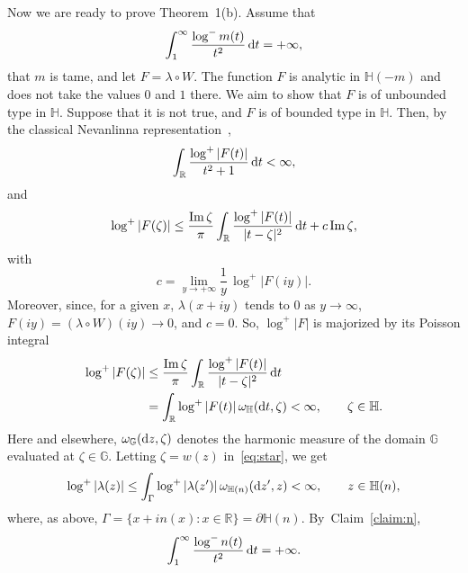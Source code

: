 \documentclass[12pt]{paper}
\newcommand{\bR}{\mathbb R}
\newcommand{\bH}{\mathbb H}
\newcommand{\bG}{\mathbb G}
\newcommand{\la}{\lambda}
\newcommand{\im}{{\rm Im}\,}
\begin{document}
Now we are ready to prove Theorem~1(b). Assume that 
\[ \int_1^\infty \frac{\log^- m(t)}{t^2}\, {\rm d}t = +\infty, \] 
that $m$ is tame, and let $F=\lambda \circ W$. The function $F$ is analytic in $\bH(-m)$ and does not take the values $0$ and $1$
there. We aim to show that $F$ is of unbounded type in $\bH$. Suppose that 
it is not true, and $F$ is of bounded type in $\bH$. Then, 
by the classical Nevanlinna representation~\cite[Chapter~VI, Theorem~3.1]{GO},
\begin{equation}\label{eq:logintegral}
\int_{\bR} \frac{\log^+|F(t)|}{t^2+1}\, {\rm d}t <\infty,
\end{equation}
and 
\[
\log^+|F(\zeta)| 
\le  \frac{\im \zeta}\pi \int_\bR \frac{\log^+ |F(t)|}{|t-\zeta|^2} \, {\rm d}t + c\, {\rm Im\,}\zeta,
\]
with
\[
c = \lim_{y\to +\infty} \frac1y\, \log^+ |F(iy)|.
\]
Moreover, since, for a given $x$, $\lambda (x+iy)$ tends to $0$ as $y\to\infty$,
$F(iy) = (\la\circ W)(iy)\to 0$, and $c=0$. So, 
$\log^+ |F|$ is majorized by its Poisson integral  
\begin{align}\label{eq:star}
\nonumber \log^+|F(\zeta)| 
&\le  \frac{\im \zeta}\pi \int_\bR \frac{\log^+ |F(t)|}{|t-\zeta|^2} \, {\rm d}t \\
&=  \int_\bR \log^+ |F(t)|\, \omega_\bH ({\rm d}t, \zeta) < \infty, \qquad \zeta\in\bH.
\end{align}
Here and elsewhere, $\omega_{\bG}({\rm d}z, \zeta)$ denotes the harmonic measure of the domain
$\bG$ evaluated at $\zeta\in\bG$.
Letting $\zeta=w(z)$ in~\eqref{eq:star}, we get
\begin{equation}\label{eq:starstar}
\log^+ |\lambda (z)| \le
\int_\Gamma \log^+ |\lambda (z')|\, \omega_{\bH (n)}({\rm d}z', z) < \infty, 
\qquad z\in \bH(n),
\end{equation}
where, as above,  $\Gamma =\{x+i n(x)\colon x\in \bR\}=\partial \bH(n)$.
By~Claim~\ref{claim:n},
\[ \int_1^\infty \frac{\log^- n(t)}{t^2} \, {\rm d}t = +\infty. \] 
\end{document}
